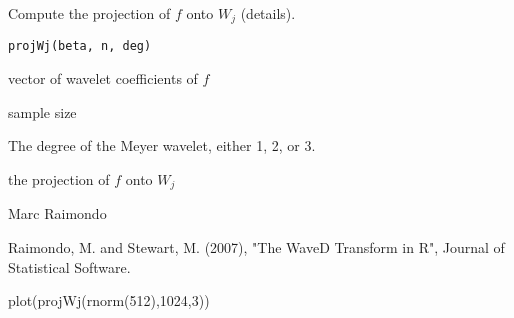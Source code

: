 \documentclass{article}
\begin{document}
\begin{Description}\relax
Compute the projection of $f$ onto $W_j$ (details).
\end{Description}
\begin{Usage}
\begin{verbatim}
projWj(beta, n, deg)
\end{verbatim}
\end{Usage}
\begin{Arguments}
\begin{ldescription}
\item[\code{beta}] vector of wavelet coefficients of $f$
\item[\code{n}] sample size
\item[\code{deg}] The degree of the Meyer wavelet, either 1, 2, or 3.
\end{ldescription}
\end{Arguments}
\begin{Value}
the projection of $f$ onto $W_j$
\end{Value}
\begin{Author}\relax
Marc Raimondo
\end{Author}
\begin{References}\relax
Raimondo, M. and Stewart, M. (2007),
"The WaveD Transform in R", Journal of Statistical Software.
\end{References}
\begin{SeeAlso}\relax
{}
\end{SeeAlso}
\begin{Examples}
\begin{ExampleCode}
 plot(projWj(rnorm(512),1024,3))
\end{ExampleCode}
\end{Examples}
\end{document}
